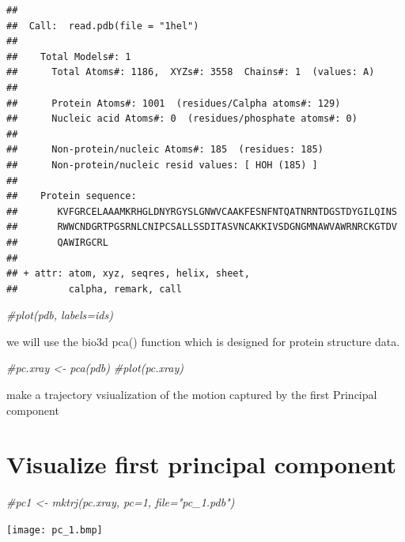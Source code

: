 \documentclass[
]{article}
\newenvironment{Shaded}{\begin{snugshade}}{\end{snugshade}}
\newcommand{\CommentTok}[1]{\textcolor[rgb]{0.56,0.35,0.01}{\textit{#1}}}
\begin{document}
\begin{verbatim}
## 
##  Call:  read.pdb(file = "1hel")
## 
##    Total Models#: 1
##      Total Atoms#: 1186,  XYZs#: 3558  Chains#: 1  (values: A)
## 
##      Protein Atoms#: 1001  (residues/Calpha atoms#: 129)
##      Nucleic acid Atoms#: 0  (residues/phosphate atoms#: 0)
## 
##      Non-protein/nucleic Atoms#: 185  (residues: 185)
##      Non-protein/nucleic resid values: [ HOH (185) ]
## 
##    Protein sequence:
##       KVFGRCELAAAMKRHGLDNYRGYSLGNWVCAAKFESNFNTQATNRNTDGSTDYGILQINS
##       RWWCNDGRTPGSRNLCNIPCSALLSSDITASVNCAKKIVSDGNGMNAWVAWRNRCKGTDV
##       QAWIRGCRL
## 
## + attr: atom, xyz, seqres, helix, sheet,
##         calpha, remark, call
\end{verbatim}

\begin{Shaded}
\end{Shaded}

\begin{Shaded}
\begin{Highlighting}[]
\CommentTok{\#plot(pdb, labels=ids)}
\end{Highlighting}
\end{Shaded}

we will use the bio3d pca() function which is designed for protein
structure data.

\begin{Shaded}
\begin{Highlighting}[]
\CommentTok{\#pc.xray \textless{}{-} pca(pdb)}
\CommentTok{\#plot(pc.xray)}
\end{Highlighting}
\end{Shaded}

make a trajectory vsiualization of the motion captured by the first
Principal component

\hypertarget{visualize-first-principal-component}{%
\section{Visualize first principal
component}\label{visualize-first-principal-component}}

\begin{Shaded}
\begin{Highlighting}[]
\CommentTok{\#pc1 \textless{}{-} mktrj(pc.xray, pc=1, file="pc\_1.pdb")}
\end{Highlighting}
\end{Shaded}

\texttt{[image: pc\_1.bmp]}
\end{document}
